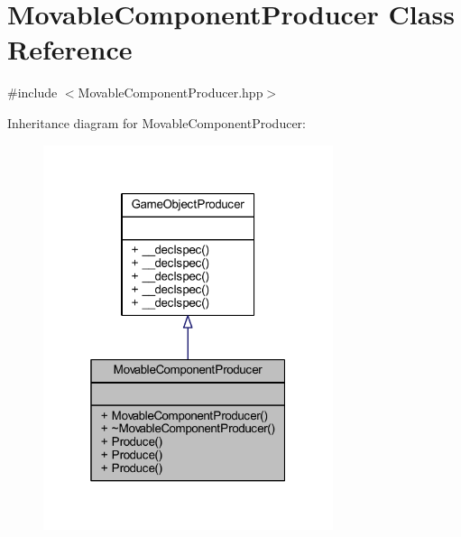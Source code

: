 \hypertarget{class_movable_component_producer}{\section{Movable\-Component\-Producer Class Reference}
\label{class_movable_component_producer}
}


{\ttfamily \#include $<$Movable\-Component\-Producer.\-hpp$>$}



Inheritance diagram for Movable\-Component\-Producer\-:\nopagebreak
\begin{figure}[H]
\begin{center}
\leavevmode
\includegraphics[width=241pt]{class_movable_component_producer__inherit__graph}
\end{center}
\end{figure}


